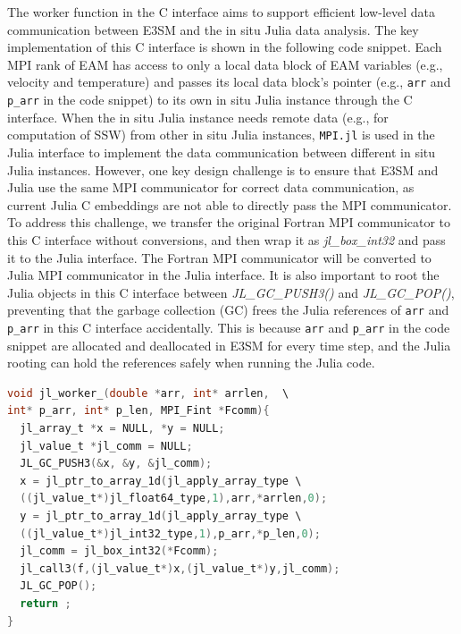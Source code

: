 \documentclass{juliacon}
\begin{document}
The worker function in the C interface aims to support efficient low-level data communication between E3SM and the in situ Julia data analysis. The key implementation of this C interface is shown in the following code snippet. Each MPI rank of EAM has access to only a local data block of EAM variables (e.g., velocity and temperature) and passes its local data block's pointer (e.g., \texttt{arr} and \texttt{p\_arr} in the code snippet) to its own in situ Julia instance through the C interface. When the in situ Julia instance needs remote data (e.g., for computation of SSW) from other in situ Julia instances, \texttt{MPI.jl} is used in the Julia interface to implement the data communication between different in situ Julia instances. However, one key design challenge is to ensure that E3SM and Julia use the same MPI communicator for correct data communication, as current Julia C embeddings are not able to directly pass the MPI communicator. To address this challenge, we transfer the original Fortran MPI communicator to this C interface without conversions, and then wrap it as \textit{jl\_box\_int32} and pass it to the Julia interface. The Fortran MPI communicator will be converted to Julia MPI communicator in the Julia interface. It is also important to root the Julia objects in this C interface between \textit{JL\_GC\_PUSH3()} and \textit{JL\_GC\_POP()}, preventing that the garbage collection (GC) frees the Julia references of \texttt{arr} and \texttt{p\_arr} in this C interface accidentally. This is because \texttt{arr} and \texttt{p\_arr} in the code snippet are allocated and deallocated in E3SM for every time step, and the Julia rooting can hold the references safely when running the Julia code.

\begin{minipage}{\linewidth}
\begin{lstlisting}[language = C, caption={C interface worker.}]
void jl_worker_(double *arr, int* arrlen,  \
int* p_arr, int* p_len, MPI_Fint *Fcomm){
  jl_array_t *x = NULL, *y = NULL;
  jl_value_t *jl_comm = NULL;
  JL_GC_PUSH3(&x, &y, &jl_comm);
  x = jl_ptr_to_array_1d(jl_apply_array_type \
  ((jl_value_t*)jl_float64_type,1),arr,*arrlen,0);
  y = jl_ptr_to_array_1d(jl_apply_array_type \
  ((jl_value_t*)jl_int32_type,1),p_arr,*p_len,0);
  jl_comm = jl_box_int32(*Fcomm);
  jl_call3(f,(jl_value_t*)x,(jl_value_t*)y,jl_comm);
  JL_GC_POP();
  return ;
}

\end{lstlisting}
\end{minipage}
\end{document}
